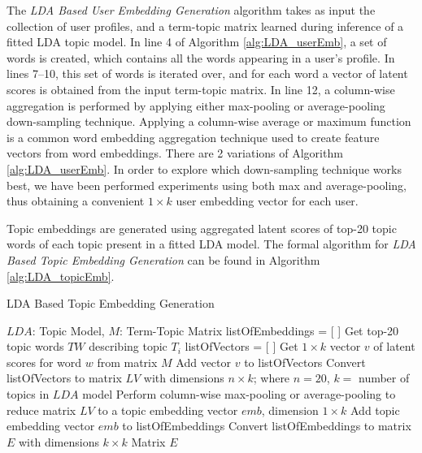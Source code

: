             The \emph{LDA Based User Embedding Generation} algorithm takes as input the collection of user profiles, and a term-topic matrix learned during inference of a fitted LDA topic model. In line 4 of Algorithm \ref{alg:LDA_userEmb}, a set of words is created, which contains all the words appearing in a user's profile. In lines 7--10, this set of words is iterated over, and for each word a vector of latent scores is obtained from the input term-topic matrix. In line 12, a column-wise aggregation is performed by applying either max-pooling or average-pooling down-sampling technique. Applying a column-wise average or maximum function is a common word embedding aggregation technique \cite{de2016representation} used to create feature vectors from word embeddings. There are 2 variations of Algorithm \ref{alg:LDA_userEmb}. In order to explore which down-sampling technique works best, we have been performed experiments using both max and average-pooling, thus obtaining a convenient $1 \times k$ user embedding vector for each user.
            
                    
            Topic embeddings are generated using aggregated latent scores of top-20 topic words of each topic present in a fitted LDA model. The formal algorithm for \emph{LDA Based Topic Embedding Generation} can be found in Algorithm \ref{alg:LDA_topicEmb}. 
        
            \begin{algorithm}
                \caption{LDA Based Topic Embedding Generation}
                \label{alg:LDA_topicEmb}
                \begin{algorithmic}[1]
                    \REQUIRE $LDA$: Topic Model, $M$: Term-Topic Matrix
                    \STATE listOfEmbeddings = [ ]
                        \STATE Get top-20 topic words $TW$ describing topic $T_i$
                        \STATE listOfVectors = [ ]
                        \STATE
                            \STATE Get $1 \times k$ vector $v$ of latent scores for word $w$ from matrix $M$
                            \STATE Add vector $v$ to listOfVectors
                        \ENDFOR
                        \STATE Convert listOfVectors to matrix $LV$ with dimensions $n \times k$; where $n=20$, $k=$ number of topics in $LDA$ model
                        \STATE Perform column-wise max-pooling or average-pooling to reduce matrix $LV$ to a topic embedding vector $emb$, dimension $1 \times k$
                        \STATE Add topic embedding vector $emb$ to listOfEmbeddings
                    \ENDFOR
                    \STATE Convert listOfEmbeddings to matrix $E$ with dimensions $k \times k$
                    \RETURN Matrix $E$
                \end{algorithmic}
            \end{algorithm}
            
